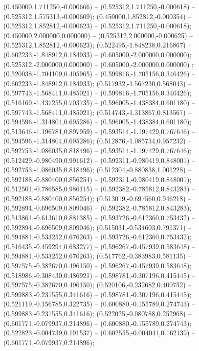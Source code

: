 (0.450000,1.711250,-0.000666) -- (0.525312,1.711250,-0.000618) -- (0.525312,1.575313,-0.000609);
 (0.450000,1.852812,-0.000354) -- (0.525312,1.852812,-0.000623) -- (0.525312,1.711250,-0.000618);
 (0.450000,2.000000,0.000000) -- (0.525312,2.000000,-0.000625) -- (0.525312,1.852812,-0.000623);
 (0.522495,-1.848238,0.216867) -- (0.602233,-1.848912,0.184933) -- (0.605000,-2.000000,0.000000);
 (0.525312,-2.000000,0.000000) -- (0.605000,-2.000000,0.000000) ;
 (0.520038,-1.704109,0.405965) -- (0.599816,-1.705156,0.346426) -- (0.602233,-1.848912,0.184933);
 (0.517932,-1.567230,0.568043) -- (0.597743,-1.568411,0.485021) -- (0.599816,-1.705156,0.346426);
 (0.516169,-1.437255,0.703735) -- (0.596005,-1.438384,0.601180) -- (0.597743,-1.568411,0.485021);
 (0.514743,-1.313867,0.813567) -- (0.594596,-1.314804,0.695286) -- (0.596005,-1.438384,0.601180);
 (0.513646,-1.196781,0.897959) -- (0.593514,-1.197429,0.767646) -- (0.594596,-1.314804,0.695286);
 (0.512876,-1.085734,0.957232) -- (0.592753,-1.086035,0.818496) -- (0.593514,-1.197429,0.767646);
 (0.512429,-0.980490,0.991612) -- (0.592311,-0.980419,0.848001) -- (0.592753,-1.086035,0.818496);
 (0.512304,-0.880838,1.001228) -- (0.592188,-0.880400,0.856254) -- (0.592311,-0.980419,0.848001);
 (0.512501,-0.786585,0.986115) -- (0.592382,-0.785812,0.843283) -- (0.592188,-0.880400,0.856254);
 (0.513019,-0.697560,0.946218) -- (0.592894,-0.696509,0.809046) -- (0.592382,-0.785812,0.843283);
 (0.513861,-0.613610,0.881385) -- (0.593726,-0.612360,0.753432) -- (0.592894,-0.696509,0.809046);
 (0.515031,-0.534603,0.791371) -- (0.594881,-0.533252,0.676263) -- (0.593726,-0.612360,0.753432);
 (0.516435,-0.459294,0.683277) -- (0.596267,-0.457939,0.583648) -- (0.594881,-0.533252,0.676263);
 (0.517762,-0.383983,0.581135) -- (0.597575,-0.382670,0.496150) -- (0.596267,-0.457939,0.583648);
 (0.518986,-0.308430,0.486921) -- (0.598781,-0.307196,0.415445) -- (0.597575,-0.382670,0.496150);
 (0.520106,-0.232682,0.400752) -- (0.599883,-0.231555,0.341616) -- (0.598781,-0.307196,0.415445);
 (0.521119,-0.156785,0.322735) -- (0.600880,-0.155789,0.274743) -- (0.599883,-0.231555,0.341616);
 (0.522025,-0.080788,0.252968) -- (0.601771,-0.079937,0.214896) -- (0.600880,-0.155789,0.274743);
 (0.522823,-0.004739,0.191537) -- (0.602555,-0.004041,0.162139) -- (0.601771,-0.079937,0.214896);

